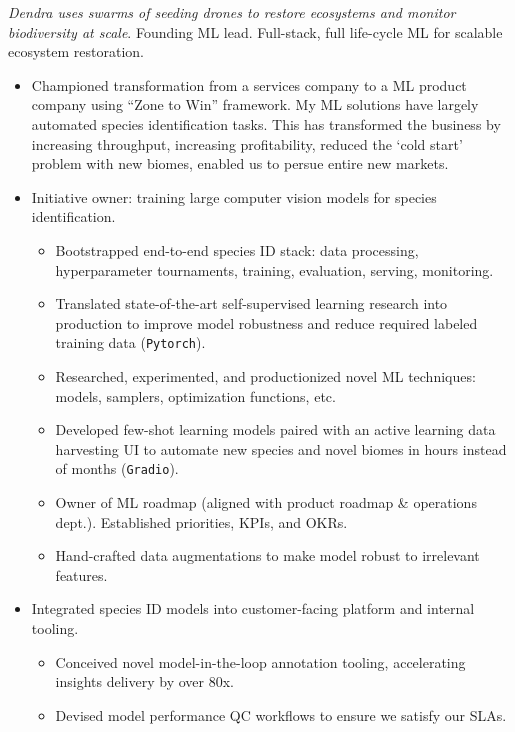 \documentclass[a4paper,12pt]{article}
\begin{document}
    \vspace{-6pt} \textit{Dendra uses swarms of seeding drones to restore ecosystems and monitor biodiversity at scale}. Founding ML lead. Full-stack, full life-cycle ML for scalable ecosystem restoration.
    \begin{itemize}
        \item Championed transformation from a services company to a ML product company using ``Zone to Win'' framework. My ML solutions have largely automated species identification tasks. This has transformed the business by increasing throughput, increasing profitability, reduced the `cold start' problem with new biomes, enabled us to persue entire new markets.
        \item Initiative owner: training large computer vision models for species identification.
        \begin{itemize}
            \item Bootstrapped end-to-end species ID stack: data processing, hyperparameter tournaments, training, evaluation, serving, monitoring.
            \item Translated state-of-the-art self-supervised learning research into production to improve model robustness and reduce required labeled training data (\texttt{Pytorch}).
            \item Researched, experimented, and productionized novel ML techniques: models, samplers, optimization functions, etc.
            \item Developed few-shot learning models paired with an active learning data harvesting UI to automate new species and novel biomes in hours instead of months (\texttt{Gradio}).
            \item Owner of ML roadmap (aligned with product roadmap \& operations dept.). Established priorities, KPIs, and OKRs.
            \item Hand-crafted data augmentations to make model robust to irrelevant features.
        \end{itemize}
        \item Integrated species ID models into customer-facing platform and internal tooling.
        \begin{itemize}
            \item Conceived novel model-in-the-loop annotation tooling, accelerating insights delivery by over 80x.
            \item Devised model performance QC workflows to ensure we satisfy our SLAs.
        \end{itemize}

\end{itemize}
\end{document}
